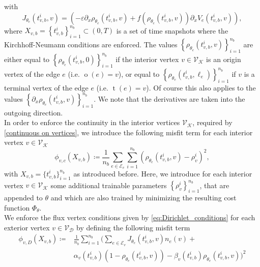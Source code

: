 with 
\begin{equation} 
    \label{misfit flux}
    J_{\theta_e}\left( t_{v,b}^i, v \right) = \left( - \varepsilon \partial_x \rho_{\theta_e}  \left( t_{v,b}^i, v \right) + f \left( \rho_{\theta_e}  \left( t_{v,b}^i, v \right) \right) \partial_x V_e \left( t_{v,b}^i, v \right) \right),
\end{equation}
where $X_{v,b} = \left\{ t_{v,b}^i \right\}_{i=1}^{n_b} \subset \left( 0,T \right)$ is a set of time snapshots where the Kirchhoff-Neumann conditions are enforced. The values $\left\{ \rho_{\theta_e}  \left( t_{v,b}^i, v \right) \right\}_{i=1}^{n_b}$ are either equal to $\left\{ \rho_{\theta_e}  \left( t_{v,b}^i, 0 \right) \right\}_{i=1}^{n_b}$ if the interior vertex $v \in \mathcal{V}_\mathcal{K}$ is an origin vertex of the edge $e$ (i.e. $\operatorname{o}(e) = v$), or equal to $\left\{ \rho_{\theta_e}  \left( t_{v,b}^i, \ell_e \right) \right\}_{i=1}^{n_b}$ if $v$ is a terminal vertex of the edge $e$ (i.e. $\operatorname{t}(e) = v$). Of course this also applies to the values $\left\{ \partial_x \rho_{\theta_e}  \left( t_{v,b}^i, v \right) \right\}_{i=1}^{n_b}$. We note that the derivatives are taken into the outgoing direction. \\
In order to enforce the continuity in the interior vertices $\mathcal{V}_\mathcal{K}$, required by \cref{continuous on vertices}, we introduce the following misfit term for each interior vertex $v \in \mathcal{V}_\mathcal{K}$ 
\begin{equation} 
    \label{misfit:continuity}
    \phi_{v,c}  \left( X_{v,b} \right) \coloneqq \frac{1}{n_b} \sum_{e \in \mathcal{E}_v} \sum_{i=1}^{n_b} \left(  \rho_{\theta_e}  \left( t_{v,b}^i, v \right) - \rho_{v}^i \right)^2,
\end{equation} 
with $X_{v,b} = \{t_{v,b}^i\}_{i=1}^{n_b}$ as introduced before. Here, we introduce for each interior vertex $v \in \mathcal{V}_\mathcal{K}$ some additional trainable parameters $\left\{ \rho_{v}^i \right\}_{i=1}^{n_b}$, that are appended to $\theta$ and which are also trained by minimizing the resulting cost function $\Phi_\theta$. \\
We enforce the flux vertex conditions given by \cref{eq:Dirichlet_conditions} for each exterior vertex $v \in \mathcal{V}_\mathcal{D}$ by defining the following misfit term  
\begin{equation}
    \label{misfit:Dirichlet}
    \begin{aligned} 
        \phi_{v,D}  \left( X_{v,b} \right) \coloneqq & \frac{1}{n_b} \sum_{i=1}^{n_b} \bigg( \sum_{e \in \mathcal{E}_v} J_{\theta_e}\left( t_{v,b}^i, v \right) n_e  \left( v \right) + \\
        & \alpha_v \left( t_{v,b}^i \right)  \left( 1- \rho_{\theta_e}  \left( t_{v,b}^i, v \right) \right) - \beta_v \left( t_{v,b}^i \right) \rho_{\theta_e}  \left( t_{v,b}^i, v \right) \bigg)^2
    \end{aligned}
\end{equation}
